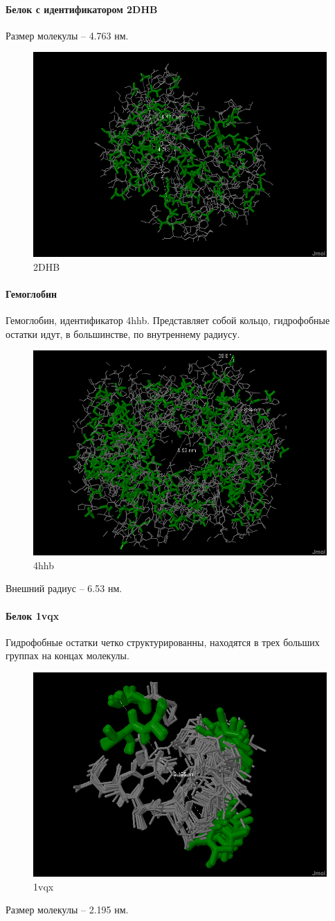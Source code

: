 \documentclass{article}
\begin{document}
	\paragraph*{Белок с идентификатором 2DHB\\}
	Размер молекулы -- 4.763 нм.
	\begin{figure}[H]
		\centering
		\includegraphics[width=0.7\linewidth]{2dhb}
		\caption{2DHB}
		\label{fig:2dhb}
	\end{figure}
	\paragraph*{Гемоглобин\\}
	Гемоглобин, идентификатор 4hhb. Представляет собой кольцо, гидрофобные остатки идут, в большинстве, по внутреннему радиусу.
	\begin{figure}[H]
		\centering
		\includegraphics[width=0.7\linewidth]{4hhb}
		\caption{4hhb}
		\label{fig:4hhb}
	\end{figure}
	Внешний радиус -- 6.53 нм.
	\paragraph*{Белок 1vqx \\}
	Гидрофобные остатки четко структурированны, находятся в трех больших группах на концах молекулы.
	\begin{figure}[H]
		\centering
		\includegraphics[width=0.68\linewidth]{1vqx}
		\caption{1vqx}
		\label{fig:1vqx}
	\end{figure}
	Размер молекулы -- 2.195 нм.
\end{document}

